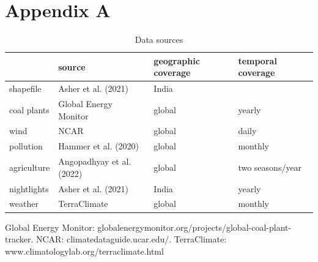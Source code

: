 \documentclass[
]{article}
\begin{document}
\FloatBarrier
\newpage

\hypertarget{appendix-a}{%
\section*{Appendix A}\label{appendix-a}}

\setcounter{table}{0} \renewcommand{\thetable}{A\arabic{table}} \setcounter{figure}{0} \renewcommand{\thefigure}{A\arabic{figure}} 
\FloatBarrier

\begin{table}[H]

\caption{\label{tab:data}Data sources}
\centering
\begin{threeparttable}
\begin{tabular}[t]{>{\raggedright\arraybackslash}p{2cm}>{\centering\arraybackslash}p{4.5cm}>{\centering\arraybackslash}p{3.5cm}>{\centering\arraybackslash}p{3.5cm}}
\toprule
  & source & geographic coverage & temporal coverage\\
\midrule
shapefile & Asher et al. (2021) & India & \\
coal plants & Global Energy Monitor & global & yearly\\
wind & NCAR & global & daily\\
pollution & Hammer et al. (2020) & global & monthly\\
agriculture & Angopadhyay et al. (2022) & global & two seasons/year\\
nightlights & Asher et al. (2021) & India & yearly\\
weather & TerraClimate & global & monthly\\
\bottomrule
\end{tabular}
\begin{tablenotes}[para]
\item Global Energy Monitor: globalenergymonitor.org/projects/global-coal-plant-tracker. NCAR: climatedataguide.ucar.edu/. TerraClimate: www.climatologylab.org/terraclimate.html
\end{tablenotes}
\end{threeparttable}
\end{table}
\end{document}
